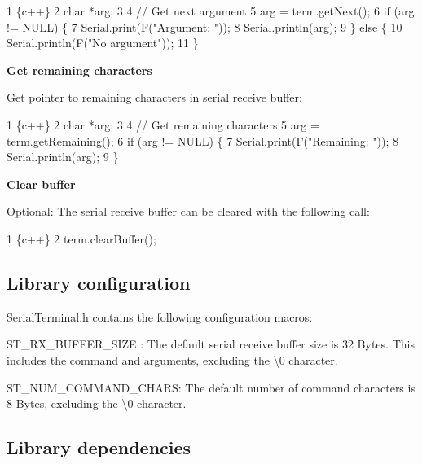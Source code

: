 \begin{DoxyCode}
1 \{c++\}
2 char *arg;
3 
4 // Get next argument
5 arg = term.getNext();
6 if (arg != NULL) \{
7     Serial.print(F("Argument: "));
8     Serial.println(arg);
9 \} else \{
10     Serial.println(F("No argument"));
11 \}
\end{DoxyCode}


{\bfseries Get remaining characters}

Get pointer to remaining characters in serial receive buffer\+:


\begin{DoxyCode}
1 \{c++\}
2 char *arg;
3 
4 // Get remaining characters
5 arg = term.getRemaining();
6 if (arg != NULL) \{
7     Serial.print(F("Remaining: "));
8     Serial.println(arg);
9 \}
\end{DoxyCode}


{\bfseries Clear buffer}

Optional\+: The serial receive buffer can be cleared with the following call\+:


\begin{DoxyCode}
1 \{c++\}
2 term.clearBuffer();
\end{DoxyCode}


\subsection*{Library configuration}

{\ttfamily Serial\+Terminal.\+h} contains the following configuration macro\textquotesingle{}s\+:


\begin{DoxyItemize}
\item {\ttfamily S\+T\+\_\+\+R\+X\+\_\+\+B\+U\+F\+F\+E\+R\+\_\+\+S\+I\+ZE} \+: The default serial receive buffer size is 32 Bytes. This includes the command and arguments, excluding the {\ttfamily \textquotesingle{}\textbackslash{}0\textquotesingle{}} character.
\item {\ttfamily S\+T\+\_\+\+N\+U\+M\+\_\+\+C\+O\+M\+M\+A\+N\+D\+\_\+\+C\+H\+A\+RS}\+: The default number of command characters is 8 Bytes, excluding the {\ttfamily \textquotesingle{}\textbackslash{}0\textquotesingle{}} character.
\end{DoxyItemize}

\subsection*{Library dependencies}


